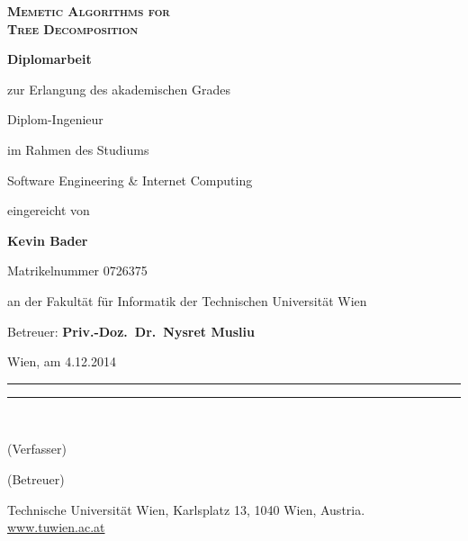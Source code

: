 \documentclass[thesis.tex]{subfiles}
\begin{document}
{

\vspace{4\baselineskip}
\begin{center}
   \bfseries\scshape\HUGE
   Memetic Algorithms for\\
   Tree Decomposition
\end{center}

\bigskip
\begin{center}
   \bfseries\LARGE
   Diplomarbeit
\end{center}

\smallskip
\begin{center}
   zur Erlangung des akademischen Grades
\end{center}

\smallskip
\begin{center}
   \LARGE
   Diplom-Ingenieur
\end{center}

\smallskip
\begin{center}
   im Rahmen des Studiums
\end{center}

\smallskip
\begin{center}
   \LARGE
   Software Engineering \& Internet Computing
\end{center}

\smallskip
\begin{center}
   eingereicht von
\end{center}

\smallskip
\begin{center}
   \LARGE\bfseries
   Kevin Bader
\end{center}
\begin{center}
   Matrikelnummer 0726375
\end{center}

\smallskip
\begin{center}
   an der Fakultät für Informatik der Technischen Universität Wien
\end{center}

\smallskip
\begin{center}
   Betreuer: \textbf{Priv.-Doz.\ Dr.\ Nysret Musliu}
\end{center}

\vspace{7\baselineskip}
\noindent
Wien, am 4.12.2014\hfill \rule{.35\textwidth}{.5pt}\hfill \rule{.35\textwidth}{.5pt}\\[0.2\baselineskip]
\phantom{Wien, am 4.12.2014}\hfill \parbox{.35\textwidth}{\centering\sffamily (Verfasser)}\hfill \parbox{.35\textwidth}{\centering\sffamily (Betreuer)}

\vspace{4\baselineskip}
\footnotesize
\begin{center}
   Technische Universität Wien, Karlsplatz 13, 1040 Wien, Austria. \href{www.tuwien.ac.at}{www.tuwien.ac.at}
\end{center}

}

\restoregeometry
\end{document}
